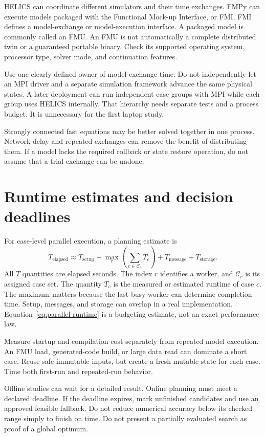 \documentclass[11pt,a4paper]{report}
\begin{document}
HELICS can coordinate different simulators and their time exchanges.
FMPy can execute models packaged with the Functional Mock-up Interface, or FMI.
FMI defines a model-exchange or model-execution interface.
A packaged model is commonly called an FMU.
An FMU is not automatically a complete distributed twin or a guaranteed portable binary.
Check its supported operating system, processor type, solver mode, and continuation features.

Use one clearly defined owner of model-exchange time.
Do not independently let an MPI driver and a separate simulation framework advance the same physical states.
A later deployment can run independent case groups with MPI while each group uses HELICS internally.
That hierarchy needs separate tests and a process budget.
It is unnecessary for the first laptop study.

Strongly connected fast equations may be better solved together in one process.
Network delay and repeated exchanges can remove the benefit of distributing them.
If a model lacks the required rollback or state restore operation, do not assume that a trial exchange can be undone.

\section{Runtime estimates and decision deadlines}
For case-level parallel execution, a planning estimate is
\begin{equation}
T_{\mathrm{elapsed}}\approx T_{\mathrm{setup}}+
\max_r\left(\sum_{c\in\mathcal{C}_r}T_c\right)
+T_{\mathrm{message}}+T_{\mathrm{storage}}.
\label{eq:parallel-runtime}
\end{equation}
All $T$ quantities are elapsed seconds.
The index $r$ identifies a worker, and $\mathcal{C}_r$ is its assigned case set.
The quantity $T_c$ is the measured or estimated runtime of case $c$.
The maximum matters because the last busy worker can determine completion time.
Setup, messages, and storage can overlap in a real implementation.
Equation~\ref{eq:parallel-runtime} is a budgeting estimate, not an exact performance law.

Measure startup and compilation cost separately from repeated model execution.
An FMU load, generated-code build, or large data read can dominate a short case.
Reuse safe immutable inputs, but create a fresh mutable state for each case.
Time both first-run and repeated-run behavior.

Offline studies can wait for a detailed result.
Online planning must meet a declared deadline.
If the deadline expires, mark unfinished candidates and use an approved feasible fallback.
Do not reduce numerical accuracy below its checked range simply to finish on time.
Do not present a partially evaluated search as proof of a global optimum.
\end{document}
